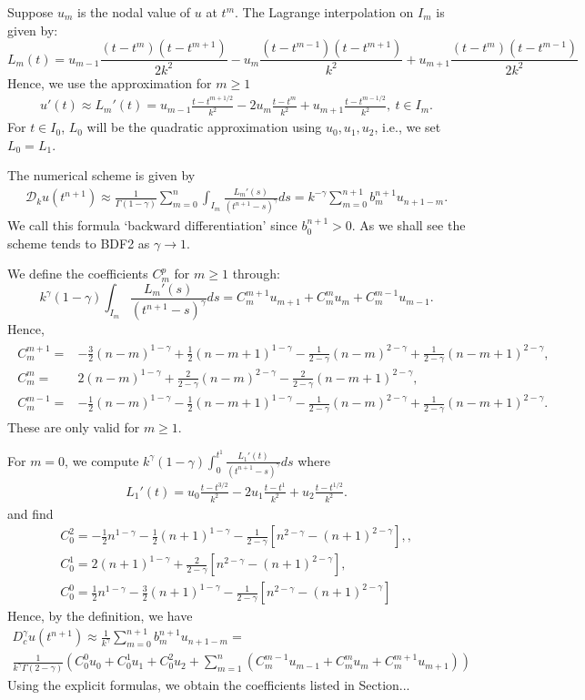 \documentclass[11pt]{article} %
\begin{document}
Suppose $u_m$ is the nodal value of $u$ at $t^m$. The Lagrange interpolation on $I_m$ is given by:
$$
L_m(t)=u_{m-1}\frac{(t-t^m)(t-t^{m+1})}{2k^2}-u_m\frac{(t-t^{m-1})(t-t^{m+1})}{k^2}+u_{m+1}\frac{(t-t^m)(t-t^{m-1})}{2k^2}
$$
Hence, we use the approximation for $m\ge 1$
\begin{gather}
u'(t)\approx L_m'(t)=u_{m-1}\frac{t-t^{m+1/2}}{k^2}-2u_m\frac{t-t^m}{k^2}+u_{m+1}\frac{t-t^{m-1/2}}{k^2},\ t\in I_m.
\end{gather}
For $t\in I_0$, $L_0$ will be the quadratic approximation using $u_0, u_1, u_2$, i.e., we set $L_0=L_1$.

The numerical scheme is given by
\begin{gather}
\mathcal{D}_ku(t^{n+1})\approx\frac{1}{\Gamma(1-\gamma)}\sum_{m=0}^n
\int_{I_m}\frac{L_m'(s)}{(t^{n+1}-s)^{\gamma}}ds=k^{-\gamma}\sum_{m=0}^{n+1}b^{n+1}_m u_{n+1-m}.
\end{gather}
We call this formula `backward differentiation' since $b_0^{n+1}>0$. As we shall see the scheme tends to BDF2 as $\gamma\to 1$.

We define the coefficients $C_m^p$ for $m\ge 1$ through: $$
k^{\gamma}(1-\gamma)\int_{I_m}\frac{L_m'(s)}{(t^{n+1}-s)^{\gamma}}ds=C_m^{m+1}u_{m+1}+C_m^mu_m+C_{m}^{m-1}u_{m-1}.
$$
Hence,
\begin{gather*}
\begin{array}{cl}
C_m^{m+1}=&-\frac{3}{2}(n-m)^{1-\gamma}+\frac{1}{2}(n-m+1)^{1-\gamma}
-\frac{1}{2-\gamma}(n-m)^{2-\gamma}+\frac{1}{2-\gamma}(n-m+1)^{2-\gamma},\\
C_m^m=&2(n-m)^{1-\gamma}+\frac{2}{2-\gamma}(n-m)^{2-\gamma}
-\frac{2}{2-\gamma}(n-m+1)^{2-\gamma},\\
C_m^{m-1}=&-\frac{1}{2}(n-m)^{1-\gamma}-\frac{1}{2}(n-m+1)^{1-\gamma}
-\frac{1}{2-\gamma}(n-m)^{2-\gamma}+\frac{1}{2-\gamma}(n-m+1)^{2-\gamma}.
\end{array}
\end{gather*}
These are only valid for $m\ge 1$.

For $m=0$, we compute $k^{\gamma}(1-\gamma)\int_0^{t^1}\frac{L_1'(t)}{(t^{n+1}-s)^{\gamma}}ds$ where
\begin{gather*}
L_1'(t)=u_{0}\frac{t-t^{3/2}}{k^2}-2u_1\frac{t-t^1}{k^2}+u_{2}\frac{t-t^{1/2}}{k^2}.
\end{gather*}
and find
\begin{gather*}
C_0^2=-\frac{1}{2}n^{1-\gamma}-\frac{1}{2}(n+1)^{1-\gamma}
-\frac{1}{2-\gamma}[n^{2-\gamma}-(n+1)^{2-\gamma}],, \\
C_0^1=2(n+1)^{1-\gamma}
+\frac{2}{2-\gamma}[n^{2-\gamma}-(n+1)^{2-\gamma}], \\
C_0^0=\frac{1}{2}n^{1-\gamma}-\frac{3}{2}(n+1)^{1-\gamma}
-\frac{1}{2-\gamma}[n^{2-\gamma}-(n+1)^{2-\gamma}]
\end{gather*}
Hence, by the definition, we have
\begin{multline*}
D_c^{\gamma}u(t^{n+1})\approx \frac{1}{k^{\gamma}}\sum_{m=0}^{n+1}b_{m}^{n+1}u_{n+1-m}=\\
\frac{1}{k^{\gamma}\Gamma(2-\gamma)}(C_0^0u_0+C_0^1u_1+C_0^2u_2+\sum_{m=1}^n(C_m^{m-1}u_{m-1}
+C_m^{m}u_m+C_m^{m+1}u_{m+1}))
\end{multline*}
Using the explicit formulas, we obtain the coefficients listed in Section...
\end{document}
